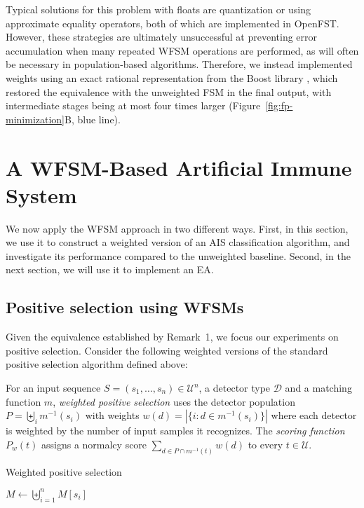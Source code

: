 \documentclass{llncs}
\begin{document}
Typical solutions for this problem with floats are quantization or using approximate
equality operators, both of which are implemented in OpenFST.
However, these strategies are ultimately unsuccessful at preventing error accumulation
when many repeated WFSM operations are performed, as will often be necessary in 
population-based algorithms. 
Therefore, we instead implemented weights using an exact rational representation 
from the Boost library \cite{Gurtovoy2002},
which restored the equivalence with the unweighted FSM in the final output,
 with  intermediate stages being at most four times larger 
(Figure~\ref{fig:fp-minimization}B, blue line).

\section{A WFSM-Based Artificial Immune System}

\label{sectionweightedrep}

We now apply the WFSM approach in two different ways. First, in this section, we use it
to construct a weighted version of an AIS classification algorithm, and investigate its
performance compared to the unweighted baseline. Second, in the next section, we will use
it to implement an EA.

\subsection{Positive selection using WFSMs}

Given the equivalence established by Remark~1, we focus 
our experiments on positive selection. 
Consider the following weighted versions of the standard positive  
selection algorithm defined above:

For an input sequence  $S=(s_1,\ldots,s_n) \in \mathcal{U}^n$, a detector type $\mathcal{D}$ and a matching function $m$, \emph{weighted positive selection} uses the detector population $P = \biguplus_i m^{-1}(s_i)$ with weights $w(d) = |\{i : d \in m^{-1}(s_i)\}|$ where each detector is weighted by the number of input samples it recognizes.
The \emph{scoring function} $P_w(t)$ assigns a normalcy score $\sum_{d \in P \cap m^{-1}(t)} w(d)$
to every $t \in \mathcal{U}$.


\begin{algorithm}
\caption{Weighted positive selection}



$M \gets \biguplus_{i=1}^{n} M[s_i]$ 

\label{algorithmweightedpossel}
\end{algorithm}
\end{document}
